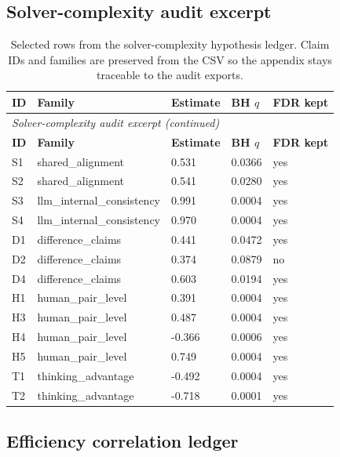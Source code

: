\documentclass[11pt,letterpaper]{article}
\begin{document}
\subsection{Solver-complexity audit excerpt}

{\scriptsize
\begin{longtable}{p{0.5in}p{1.15in}p{0.85in}p{0.85in}p{0.75in}}
\caption{Selected rows from the solver-complexity hypothesis ledger. Claim IDs and families are preserved from the CSV so the appendix stays traceable to the audit exports.} \\
\toprule
\textbf{ID} & \textbf{Family} & \textbf{Estimate} & \textbf{BH $q$} & \textbf{FDR kept} \\
\midrule
\endfirsthead
\multicolumn{5}{l}{\small\itshape Solver-complexity audit excerpt (continued)} \\
\toprule
\textbf{ID} & \textbf{Family} & \textbf{Estimate} & \textbf{BH $q$} & \textbf{FDR kept} \\
\midrule
\endhead
S1 & shared\_alignment & 0.531 & 0.0366 & yes \\
S2 & shared\_alignment & 0.541 & 0.0280 & yes \\
S3 & llm\_internal\_consistency & 0.991 & 0.0004 & yes \\
S4 & llm\_internal\_consistency & 0.970 & 0.0004 & yes \\
D1 & difference\_claims & 0.441 & 0.0472 & yes \\
D2 & difference\_claims & 0.374 & 0.0879 & no \\
D4 & difference\_claims & 0.603 & 0.0194 & yes \\
H1 & human\_pair\_level & 0.391 & 0.0004 & yes \\
H3 & human\_pair\_level & 0.487 & 0.0004 & yes \\
H4 & human\_pair\_level & -0.366 & 0.0006 & yes \\
H5 & human\_pair\_level & 0.749 & 0.0004 & yes \\
T1 & thinking\_advantage & -0.492 & 0.0004 & yes \\
T2 & thinking\_advantage & -0.718 & 0.0001 & yes \\
\bottomrule
\end{longtable}
}

\subsection{Efficiency correlation ledger}
\end{document}
